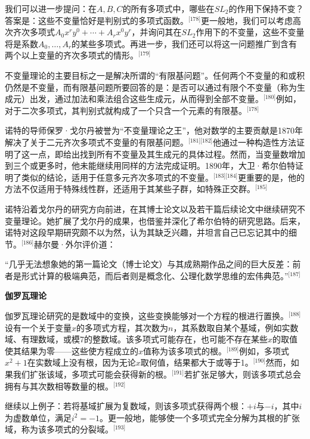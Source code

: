 我们可以进一步提问：在$ A, B, C$的所有多项式中，哪些在$ SL_2$的作用下保持不变？答案是：这些不变量恰好是判别式的多项式函数。\(^\text{[178]}\)更一般地，我们可以考虑高次齐次多项式$A_0 x^r y^0 + \cdots + A_r x^0 y^r$，并询问其在$SL_2$作用下的不变量，这些不变量将是系数$A_0, \ldots, A_r$的某些多项式。再进一步，我们还可以将这一问题推广到含有两个以上变量的齐次多项式的情形。\(^\text{[179]}\)

不变量理论的主要目标之一是解决所谓的“有限基问题”。任何两个不变量的和或积仍然是不变量，而有限基问题所要回答的是：是否可以通过有限个不变量（称为生成元）出发，通过加法和乘法组合这些生成元，从而得到全部不变量。\(^\text{[180]}\)例如，对于二次多项式，其判别式就构成了一个只含一个元素的有限基。\(^\text{[178]}\)

诺特的导师保罗·戈尔丹被誉为“不变量理论之王”，他对数学的主要贡献是1870年解决了关于二元齐次多项式不变量的有限基问题。\(^\text{[181][182]}\)他通过一种构造性方法证明了这一点，即给出找到所有不变量及其生成元的具体过程。然而，当变量数增加到三个或更多时，他未能继续用同样的方法完成证明。1890年，大卫·希尔伯特证明了类似的结论，适用于任意多元齐次多项式的不变量。\(^\text{[183][184]}\)更重要的是，他的方法不仅适用于特殊线性群，还适用于其某些子群，如特殊正交群。\(^\text{[185]}\)

诺特沿着戈尔丹的研究方向前进，在其博士论文以及若干篇后续论文中继续研究不变量理论。她扩展了戈尔丹的成果，也借鉴并深化了希尔伯特的研究思路。后来，诺特对这段早期研究颇不以为然，认为其缺乏兴趣，并坦言自己已忘记其中的细节。\(^\text{[186]}\)赫尔曼·外尔评价道：

“几乎无法想象她的第一篇论文（博士论文）与其成熟期作品之间的巨大反差：前者是形式计算的极端典范，而后者则是概念化、公理化数学思维的宏伟典范。”\(^\text{[187]}\)

\textbf{伽罗瓦理论}

伽罗瓦理论研究的是数域中的变换，这些变换能够对一个方程的根进行置换。\(^\text{[188]}\)设有一个关于变量$x$的多项式方程，其次数为$n$，其系数取自某个基域，例如实数域、有理数域，或模7的整数域。该多项式可能存在，也可能不存在某些$x$的取值使其结果为零——这些使方程成立的$x$值称为该多项式的根。\(^\text{[189]}\)例如，多项式$x^2 + 1$在实数域上没有根，因为无论$x$取何值，结果都大于或等于1。\(^\text{[190]}\)然而，如果我们扩张该域，多项式可能会获得新的根。\(^\text{[191]}\)若扩张足够大，则该多项式总会拥有与其次数相等数量的根。\(^\text{[192]}\)

继续以上例子：若将基域扩展为复数域，则该多项式获得两个根：$+i$与$-i$，其中$i$为虚数单位，满足$i^2 = -1$。更一般地，能够使一个多项式完全分解为其根的扩张域，称为该多项式的分裂域。\(^\text{[193]}\)


